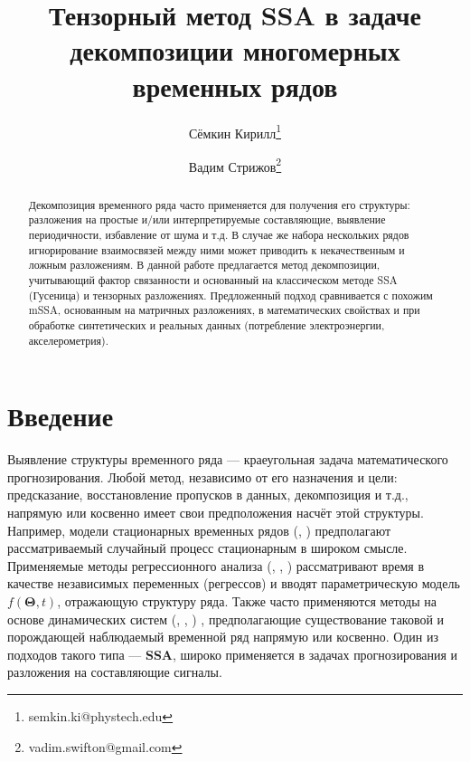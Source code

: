 
\usepackage[backend=biber]{biblatex}



\makeatletter
\let\@fnsymbol\@arabic
\makeatother

\title{Тензорный метод SSA в задаче декомпозиции многомерных временных рядов}
\author{Сёмкин Кирилл\thanks{semkin.ki@phystech.edu} \and Вадим Стрижов\thanks{vadim.swifton@gmail.com	}}
\date{}



	
	\maketitle
	
	\begin{abstract}
		
		Декомпозиция временного ряда часто применяется для получения его структуры: разложения на простые и/или интерпретируемые составляющие, выявление периодичности, избавление от шума и т.д. В случае же набора нескольких рядов игнорирование взаимосвязей между ними может приводить к некачественным и ложным разложениям. В данной работе предлагается метод декомпозиции, учитывающий фактор связанности и основанный на классическом методе SSA (Гусеница) и тензорных разложениях. Предложенный подход сравнивается с похожим mSSA, основанным на матричных разложениях, в математических свойствах и при обработке синтетических и реальных данных (потребление электроэнергии, акселерометрия).
		
	\end{abstract}
	
	\section*{Введение}\label{Intro}
	
		Выявление структуры временного ряда --- краеугольная задача математического прогнозирования. Любой метод, независимо от его назначения и цели: предсказание, восстановление пропусков в данных, декомпозиция и т.д., напрямую или косвенно имеет свои предположения насчёт этой структуры. Например, модели стационарных временных рядов (\cite{Box_Jenkins_methodology}, \cite{hamilton1994time}) предполагают рассматриваемый случайный процесс стационарным в широком смысле. Применяемые методы регрессионного анализа (\cite{3b1355aedd1041f1853e609a410576f3}, \cite{Greene2003Econometric}, \cite{enders2010applied})  рассматривают время в качестве независимых переменных (регрессов) и вводят параметрическую модель $ f(\mathbf{\Theta}, t) $, отражающую структуру ряда. Также часто применяются методы на основе динамических систем (\cite{ecfb9dc578be43ae9ee8fc88b8ff9151}, \cite{chen2018neural}, \cite{Tsonis2018}) , предполагающие существование таковой и порождающей наблюдаемый временной ряд напрямую или косвенно. Один из подходов такого типа --- \textbf{SSA}, широко применяется в задачах прогнозирования и разложения на составляющие сигналы.
		
